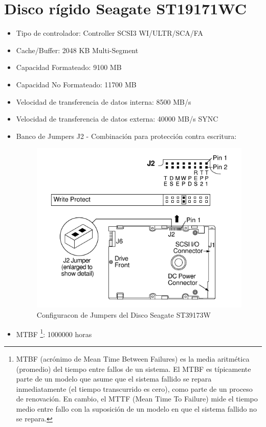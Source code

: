\documentclass[a4paper]{article}
\begin{document}
\section{Disco rígido Seagate ST19171WC}
\begin{itemize}
\item Tipo de controlador: Controller SCSI3 WI/ULTR/SCA/FA
\item Cache/Buffer: 2048 KB Multi-Segment
\item Capacidad Formateado: 9100 MB
\item Capacidad No Formateado: 11700 MB
\item Velocidad de transferencia de datos interna: 8500 MB/s 
\item Velocidad de transferencia de datos externa: 40000 MB/s SYNC
\item Banco de Jumpers J2 - Combinación para protección contra escritura:
\begin{figure}[H] \begin{center}
\includegraphics[scale=0.75]{imgs/pinesst19171wc} 
\caption{Configuracon de Jumpers del Disco Seagate ST39173W}
\end{center}
\end{figure}
\item MTBF \footnote{MTBF (acrónimo de Mean Time Between Failures) es la media aritmética (promedio) del tiempo entre fallos de un sistema. El MTBF es típicamente parte de un modelo que asume que el sistema fallido se repara inmediatamente (el tiempo transcurrido es cero), como parte de un proceso de renovación. En cambio, el MTTF (Mean Time To Failure) mide el tiempo medio entre fallo con la suposición de un modelo en que el sistema fallido no se repara.}: 1000000 horas
\end{itemize}
%
\end{document}
